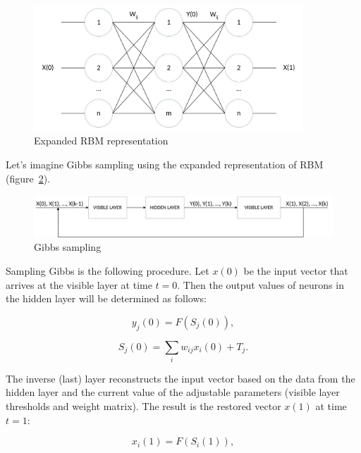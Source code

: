 \begin{figure}[H]
   \centering
   \includegraphics[width=0.9\textwidth]{man-source/images/ch2/pic2-1.pdf}
   \caption{Expanded RBM representation}
   \label{fig:pic2_1}
\end{figure}

Let's imagine Gibbs sampling using the expanded representation of RBM (figure~\ref{fig:pic2_2}).

\begin{figure}[H]
   \centering
   \includegraphics[width=\textwidth]{man-source/images/ch2/pic2-2.pdf}
   \caption{Gibbs sampling}
   \label{fig:pic2_2}
\end{figure}

Sampling Gibbs is the following procedure. Let $x(0)$ be the input vector that arrives at the visible layer at time $t=0$. Then the output values of neurons in the hidden layer will be determined as follows:

\begin{equation}
     y_j(0)=F(S_j(0)),
\end{equation}

\begin{equation}
     S_j(0)=\sum_i w_{ij}x_i(0)+T_j.
\end{equation}

The inverse (last) layer reconstructs the input vector based on the data from the hidden layer and the current value of the adjustable parameters (visible layer thresholds and weight matrix). The result is the restored vector $x(1)$ at time $t=1$:

\begin{equation}
     x_i(1)=F(S_i(1)),
\end{equation}

